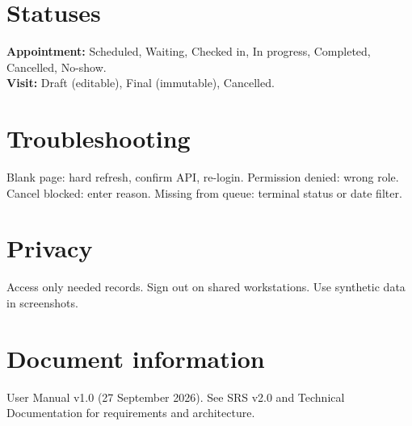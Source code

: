 \documentclass[11pt,a4paper]{article}
\begin{document}
\section{Statuses}
\textbf{Appointment:} Scheduled, Waiting, Checked in, In progress, Completed, Cancelled, No-show.\\
\textbf{Visit:} Draft (editable), Final (immutable), Cancelled.

\section{Troubleshooting}
Blank page: hard refresh, confirm API, re-login. Permission denied: wrong role. Cancel blocked: enter reason. Missing from queue: terminal status or date filter.

\section{Privacy}
Access only needed records. Sign out on shared workstations. Use synthetic data in screenshots.

\section*{Document information}
User Manual v1.0 (27 September 2026). See SRS v2.0 and Technical Documentation for requirements and architecture.
\end{document}
